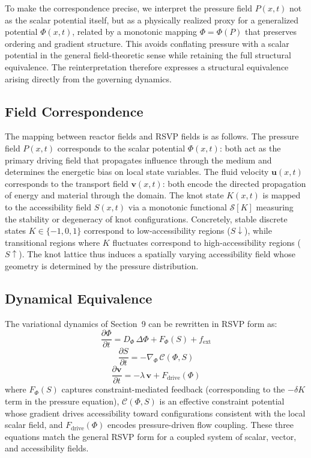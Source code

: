 \documentclass[12pt, a4paper]{article}
\begin{document}
To make the correspondence precise, we interpret the pressure field $P(x,t)$ not as the scalar potential itself, but as a physically realized proxy for a generalized potential $\Phi(x,t)$, related by a monotonic mapping $\Phi = \Phi(P)$ that preserves ordering and gradient structure. This avoids conflating pressure with a scalar potential in the general field-theoretic sense while retaining the full structural equivalence. The reinterpretation therefore expresses a structural equivalence arising directly from the governing dynamics.

\subsection{Field Correspondence}

The mapping between reactor fields and RSVP fields is as follows. The pressure field $P(x,t)$ corresponds to the scalar potential $\Phi(x,t)$: both act as the primary driving field that propagates influence through the medium and determines the energetic bias on local state variables. The fluid velocity $\mathbf{u}(x,t)$ corresponds to the transport field $\mathbf{v}(x,t)$: both encode the directed propagation of energy and material through the domain. The knot state $K(x,t)$ is mapped to the accessibility field $S(x,t)$ via a monotonic functional $\mathcal{S}[K]$ measuring the stability or degeneracy of knot configurations. Concretely, stable discrete states $K \in \{-1, 0, 1\}$ correspond to low-accessibility regions ($S \downarrow$), while transitional regions where $K$ fluctuates correspond to high-accessibility regions ($S \uparrow$). The knot lattice thus induces a spatially varying accessibility field whose geometry is determined by the pressure distribution.

\subsection{Dynamical Equivalence}

The variational dynamics of Section~9 can be rewritten in RSVP form as:
\[
\frac{\partial \Phi}{\partial t} = D_\Phi\, \Delta\Phi + F_\Phi(S) + f_{\text{ext}}
\]
\[
\frac{\partial S}{\partial t} = -\nabla_\Phi\, \mathcal{C}(\Phi, S)
\]
\[
\frac{\partial \mathbf{v}}{\partial t} = -\lambda\, \mathbf{v} + F_{\text{drive}}(\Phi)
\]
where $F_\Phi(S)$ captures constraint-mediated feedback (corresponding to the $-\delta K$ term in the pressure equation), $\mathcal{C}(\Phi, S)$ is an effective constraint potential whose gradient drives accessibility toward configurations consistent with the local scalar field, and $F_{\text{drive}}(\Phi)$ encodes pressure-driven flow coupling. These three equations match the general RSVP form for a coupled system of scalar, vector, and accessibility fields.
\end{document}
